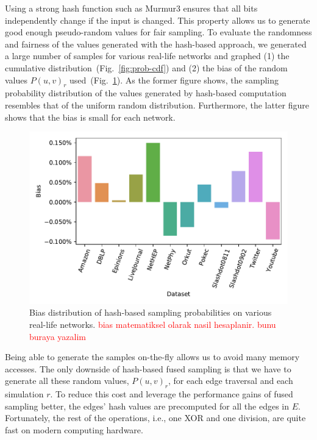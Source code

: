 \documentclass[10pt,journal,compsoc]{IEEEtran}
\newcommand\kktodo[1]{\textcolor{red}{#1}}
\begin{document}
Using a strong hash function such as {{\sc Murmur3}} ensures that all bits independently change if the input is changed. This property allows us to generate good enough pseudo-random values for fair sampling. To evaluate the randomness and fairness of the values generated with the hash-based approach, we generated a large number of samples for various real-life networks and graphed (1) the cumulative distribution~(Fig.~\ref{fig:prob-cdf}) and (2) the bias of the random values $P(u,v)_r$ used~(Fig.~\ref{fig:prob-bias}). As the former figure shows, the sampling probability distribution of the values generated by hash-based computation resembles that of the uniform random distribution. Furthermore, the latter figure shows that the bias is small for each network. 

\begin{figure}[!ht] 
    \centering
    \includegraphics[width=1\linewidth]{./images/bias.pdf}
    \caption{Bias distribution of hash-based sampling probabilities on various real-life networks. \kktodo{bias matematiksel olarak nasil hesaplanir. bunu buraya yazalim}}
    \label{fig:prob-bias} 
\end{figure}

Being able to generate the samples on-the-fly allows us to avoid many memory accesses. The only downside of hash-based fused sampling is that we have to generate all these random values,   $P(u,v)_r$, for each edge traversal and each simulation $r$. To reduce this cost and leverage the performance gains of fused sampling better, the edges' hash values are precomputed for all the edges in $E$. Fortunately, the rest of the operations, i.e., one XOR and one division, are quite fast on modern computing hardware. %
\end{document}
